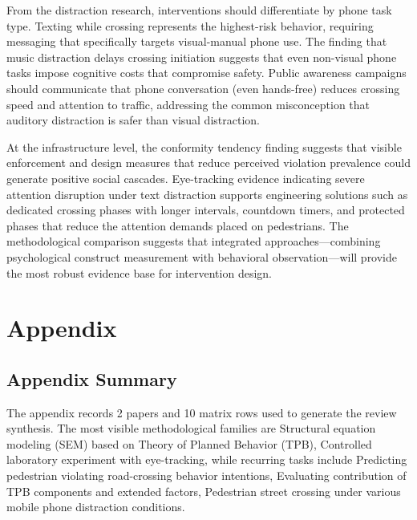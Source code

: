 \documentclass{article}
\begin{document}
From the distraction research, interventions should differentiate by phone task type. Texting while crossing represents the highest-risk behavior, requiring messaging that specifically targets visual-manual phone use. The finding that music distraction delays crossing initiation suggests that even non-visual phone tasks impose cognitive costs that compromise safety. Public awareness campaigns should communicate that phone conversation (even hands-free) reduces crossing speed and attention to traffic, addressing the common misconception that auditory distraction is safer than visual distraction. \cite{09_2018_jiang_aap}

At the infrastructure level, the conformity tendency finding suggests that visible enforcement and design measures that reduce perceived violation prevalence could generate positive social cascades. Eye-tracking evidence indicating severe attention disruption under text distraction supports engineering solutions such as dedicated crossing phases with longer intervals, countdown timers, and protected phases that reduce the attention demands placed on pedestrians. The methodological comparison suggests that integrated approaches—combining psychological construct measurement with behavioral observation—will provide the most robust evidence base for intervention design. \cite{09_2018_jiang_aap}

\appendix
\section{Appendix}
\subsection{Appendix Summary}
\noindent The appendix records 2 papers and 10 matrix rows used to generate the review synthesis. The most visible methodological families are Structural equation modeling (SEM) based on Theory of Planned Behavior (TPB), Controlled laboratory experiment with eye-tracking, while recurring tasks include Predicting pedestrian violating road-crossing behavior intentions, Evaluating contribution of TPB components and extended factors, Pedestrian street crossing under various mobile phone distraction conditions.
\end{document}
